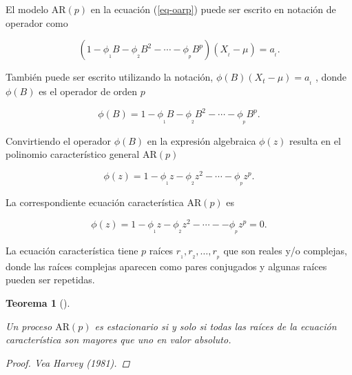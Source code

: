 \documentclass[
  us-letterpaper,
]{scrreprt}
\theoremstyle{plain}
\theoremstyle{definition}
\theoremstyle{definition}
\theoremstyle{plain}
\newtheorem{theorem}{Teorema}[chapter]
\theoremstyle{remark}
\begin{document}
El modelo \(\mathrm{AR}(p)\) en la ecuación (\ref{eq-oarp}) puede ser
escrito en notación de operador como

\[
(1-\phi_{_1}B-\phi_{_2}B^2-\cdots-\phi_{_p}B^p)(X_{_t}-\mu)=a_{_t}.
\]

También puede ser escrito utilizando la notación,
\(\phi(B)(X_{t}-\mu)=a_{_t}\) , donde \(\phi(B)\) es el operador de
orden \(p\)

\[
\phi(B)=1-\phi_{_1}B-\phi_{_2}B^2-\cdots-\phi_{_p}B^p.
\]

Convirtiendo el operador \(\phi(B)\) en la expresión algebraica
\(\phi(z)\) resulta en el polinomio característico general
\(\mathrm{AR}(p)\)

\[
\phi(z)=1-\phi_{_1}z-\phi_{_2}z^2-\cdots-\phi_{_p}z^p.
\]

La correspondiente ecuación característica \(\mathrm{AR}(p)\) es

\[\phi(z) = 1 -\phi_{_1}z -\phi_{_2}z^2 - \cdots - -\phi_{_p}z^p = 0.\]

La ecuación característica tiene \(p\) raíces
\(r_{_1}, r_{_2} ,\ldots, r_{_p}\) que son reales y/o complejas, donde
las raíces complejas aparecen como pares conjugados y algunas raíces
pueden ser repetidas.

\begin{theorem}[]\protect\hypertarget{thm-arpest}{}\label{thm-arpest}

Un proceso \(\mathrm{AR}(p)\) es estacionario si y solo si todas las
raíces de la ecuación característica son mayores que uno en valor
absoluto.

\begin{proof}
Vea Harvey (1981).
\end{proof}

\end{theorem}
\end{document}
